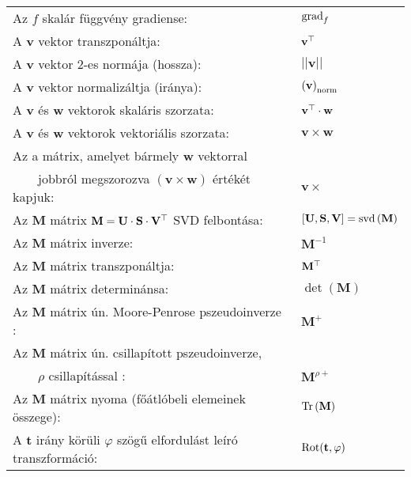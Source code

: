 \begin{tabular}{ll}
	Az $f$ skalár függvény gradiense:& $\operatorname{grad}_{f}$\\
	
	A $\mathbf v$ vektor transzponáltja:& ${\mathbf v}^{\top}$\\
	
	A $\mathbf v$ vektor 2-es normája (hossza):& $||\mathbf v||$\\
	
	A $\mathbf v$ vektor normalizáltja (iránya):& $\left( \mathbf v \right)_{\mathrm{norm}}$\\
	
	A $\mathbf v$ és $\mathbf w$ vektorok skaláris szorzata:& ${\mathbf v}^{\top}\cdot\mathbf w$\\
	
	A $\mathbf v$ és $\mathbf w$ vektorok vektoriális szorzata:& ${\mathbf v} \times\mathbf w$\\
	
	Az a mátrix, amelyet bármely $\mathbf w$ vektorral & \\
	 \ \ \ \ jobbról megszorozva $(\mathbf v\times \mathbf w)$ értékét kapjuk: & $\mathbf v\times$\\
	
	Az $\mathbf M$ mátrix $\mathbf M = \mathbf U \cdot \mathbf S \cdot \mathbf V^\top$ SVD felbontása:& $[\mathbf U,\mathbf S, \mathbf V] = \operatorname{svd}{(\mathbf M)}$\\
	
	Az $\mathbf M$ mátrix inverze:& ${\mathbf M}^{-1}$\\
	
	Az $\mathbf M$ mátrix transzponáltja:& ${\mathbf M}^{\top}$\\
	
	Az $\mathbf M$ mátrix determinánsa:& $\det{(\mathbf M)}$\\
	
	Az $\mathbf M$ mátrix ún. Moore-Penrose pszeudoinverze :& ${\mathbf M}^{+}$\\
	
	Az $\mathbf M$ mátrix ún. csillapított pszeudoinverze, & \\
	 \ \ \ \ $\rho$ csillapítással :& ${\mathbf M}^{\rho +}$\\ %
	
	Az $\mathbf M$ mátrix nyoma (főátlóbeli elemeinek összege):& $\mathrm{Tr}\left( \mathbf M \right)$\\
	
	A $\mathbf t$ irány körüli $\varphi$ szögű elfordulást leíró transzformáció:& $\mathrm{Rot}(\mathbf t,\varphi)$\\
	

\end{tabular}
